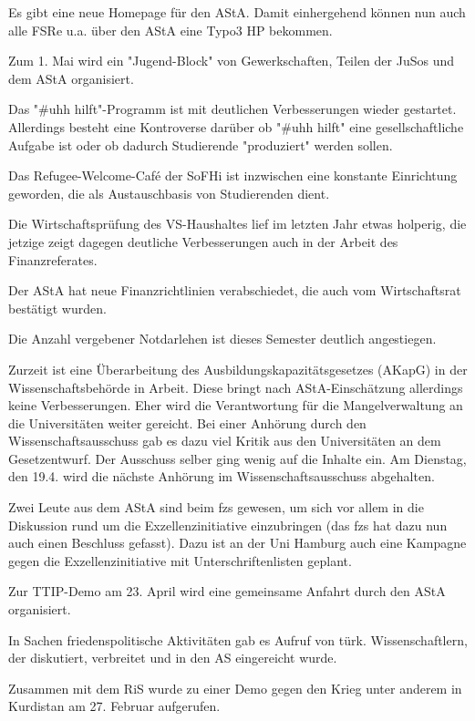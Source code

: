 \documentclass[ngerman,headheight=70pt]{scrartcl}
\begin{document}
    Es gibt eine neue Homepage für den AStA. Damit einhergehend können nun auch
    alle FSRe u.a. über den AStA eine Typo3 HP bekommen.

    Zum 1. Mai wird ein "Jugend-Block" von Gewerkschaften, Teilen der JuSos und
    dem AStA organisiert.

    Das "\#uhh hilft"-Programm ist mit deutlichen Verbesserungen wieder
    gestartet. Allerdings besteht eine Kontroverse darüber ob "\#uhh hilft"
    eine gesellschaftliche Aufgabe ist oder ob dadurch Studierende "produziert"
    werden sollen.

    Das Refugee-Welcome-Café der SoFHi ist inzwischen eine konstante Einrichtung
    geworden, die als Austauschbasis von Studierenden dient.

    Die Wirtschaftsprüfung des VS-Haushaltes lief im letzten Jahr etwas holperig,
    die jetzige zeigt dagegen deutliche Verbesserungen auch in der Arbeit des
    Finanzreferates.

    Der AStA hat neue Finanzrichtlinien verabschiedet, die auch vom Wirtschaftsrat
    bestätigt wurden.

    Die Anzahl vergebener Notdarlehen ist dieses Semester deutlich angestiegen.

    Zurzeit ist eine Überarbeitung des Ausbildungskapazitätsgesetzes (AKapG)
    in der Wissenschaftsbehörde in Arbeit. Diese bringt nach AStA-Einschätzung
    allerdings keine Verbesserungen. Eher wird die Verantwortung für die
    Mangelverwaltung an die Universitäten weiter gereicht. Bei einer Anhörung
    durch den Wissenschaftsausschuss gab es dazu viel Kritik aus den
    Universitäten an dem Gesetzentwurf. Der Ausschuss selber ging wenig auf
    die Inhalte ein. Am Dienstag, den 19.4. wird die nächste Anhörung im
    Wissenschaftsausschuss abgehalten.

    Zwei Leute aus dem AStA sind beim fzs gewesen, um sich vor allem in die
    Diskussion rund um die Exzellenzinitiative einzubringen (das fzs hat dazu
    nun auch einen Beschluss gefasst). Dazu ist an der Uni Hamburg auch eine
    Kampagne gegen die Exzellenzinitiative mit Unterschriftenlisten geplant.

    Zur TTIP-Demo am 23. April wird eine gemeinsame Anfahrt durch den AStA organisiert.

    In Sachen friedenspolitische Aktivitäten gab es Aufruf von türk.
    Wissenschaftlern, der diskutiert, verbreitet und in den AS eingereicht wurde.

    Zusammen mit dem RiS wurde zu einer Demo gegen den Krieg unter anderem
    in Kurdistan am 27. Februar aufgerufen.
\end{document}
